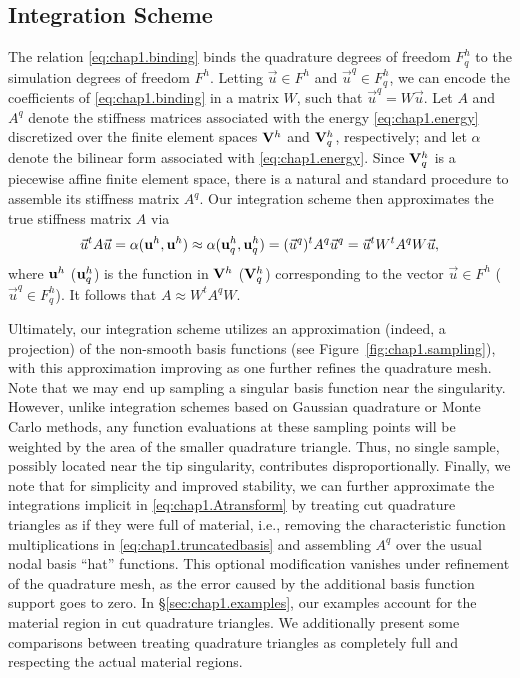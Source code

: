 \subsection{Integration Scheme}

The relation \eqref{eq:chap1.binding} binds the quadrature degrees of freedom $F_q^h$ to the simulation degrees of freedom $F^h$. Letting $\vec{u} \in F^h$ and $\vec{u}^q \in F_q^h$, we can encode the coefficients of \eqref{eq:chap1.binding} in a matrix $W$, such that $\vec{u}^q = W \vec{u}$. Let $A$ and $A^q$ denote the stiffness matrices associated with the energy \eqref{eq:chap1.energy} discretized over the finite element spaces $\mathbf{V}^h$ and $\mathbf{V}_q^h$, respectively; and let $\alpha$ denote the bilinear form associated with \eqref{eq:chap1.energy}. Since $\mathbf{V}_q^h$ is a piecewise affine finite element space, there is a natural and standard procedure to assemble its stiffness matrix $A^q$. Our integration scheme then approximates the true stiffness matrix $A$ via
\begin{equation} \label{eq:chap1.Atransform}
\vec{u}^t A \vec{u} = \alpha(\mathbf{u}^h, \mathbf{u}^h) \approx \alpha(\mathbf{u}_q^h, \mathbf{u}_q^h) = (\vec{u}^q)^t A^q \vec{u}^q = \vec{u}^t W^t A^q W \vec{u},
\end{equation}
where $\mathbf{u}^h$ ($\mathbf{u}_q^h$) is the function in $\mathbf{V}^h$ ($\mathbf{V}_q^h$) corresponding to the vector $\vec{u} \in F^h$ ($\vec{u}^q \in F_q^h$). It follows that $A \approx W^t A^q W$.

Ultimately, our integration scheme utilizes an approximation (indeed, a projection) of the non-smooth basis functions (see Figure~\ref{fig:chap1.sampling}), with this approximation improving as one further refines the quadrature mesh. Note that we may end up sampling a singular basis function near the singularity. However, unlike integration schemes based on Gaussian quadrature or Monte Carlo methods, any function evaluations at these sampling points will be weighted by the area of the smaller quadrature triangle. Thus, no single sample, possibly located near the tip singularity, contributes disproportionally. Finally, we note that for simplicity and improved stability, we can further approximate the integrations implicit in \eqref{eq:chap1.Atransform} by treating cut quadrature triangles as if they were full of material, i.e., removing the characteristic function multiplications in \eqref{eq:chap1.truncatedbasis} and assembling $A^q$ over the usual nodal basis ``hat'' functions. This optional modification vanishes under refinement of the quadrature mesh, as the error caused by the additional basis function support goes to zero. In \S\ref{sec:chap1.examples}, our examples account for the material region in cut quadrature triangles. We additionally present some comparisons between treating quadrature triangles as completely full and respecting the actual material regions.

